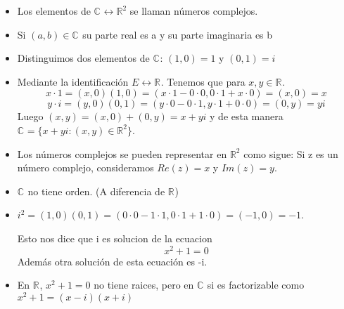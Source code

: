 \begin{itemize}
  \item Los elementos de \(\mathbb{C}^{} \leftrightarrow \mathbb{R}^{2}\) se llaman números complejos.
  \item Si \((a,b) \in \mathbb{C}^{} \) su parte real es a y su parte imaginaria es b
  \item Distinguimos dos elementos de \(\mathbb{C}^{}\): \((1,0) = 1\) y \((0,1) = i\)
  \item Mediante la identificación \( E \leftrightarrow \mathbb{R}^{}\). Tenemos que para \(x,y \in \mathbb{R}^{}\).
\[ x\cdot 1=(x,0)(1,0)=(x \cdot 1-0\cdot0, 0\cdot1+x\cdot0)=(x,0)=x \]
\[ y\cdot i=(y,0)(0,1)=(y \cdot 0-0\cdot1, y\cdot1+0\cdot0)=(0,y)=yi \]
Luego \((x,y) = (x,0)+(0,y) = x + yi\) y de esta manera \(\mathbb{C}^{} = \{x+yi : (x,y) \in \mathbb{R}^{2}\}\).
  \item Los números complejos se pueden representar en \(\mathbb{R}^{2}\) como sigue:
Si z es un número complejo, consideramos \(Re(z) = x\) y \(Im(z) = y\).
\end{itemize}

\begin{center} %
\end{center}

\begin{itemize}
  \item \( \mathbb{C}^{}\) no tiene orden. (A diferencia de \(\mathbb{R}^{}\))
  \item \(i^2 = (1,0)(0,1) = (0 \cdot 0-1 \cdot 1, 0 \cdot 1+1 \cdot 0) = (-1,0) = -1 \).
   
    Esto nos dice que i es solucion de la ecuacion
    \begin{equation*}
      x^2+1=0
    \end{equation*}
    Además otra solución de esta ecuación es -i.

  \item En \(\mathbb{R}^{}\), \(x^2+1=0 \) no tiene raices, pero en \(\mathbb{C}^{}\) si es factorizable como \(x^2+1= (x-i)(x+i)\)
\end{itemize}

